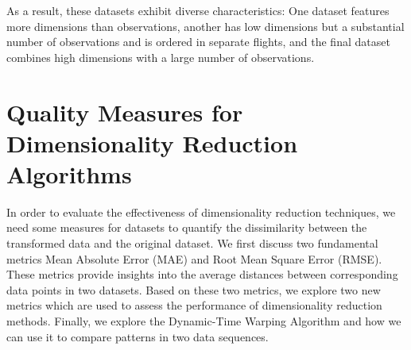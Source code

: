 \documentclass[pdftex,12pt,a4paper]{report}
\begin{document}
As a result, these datasets exhibit diverse characteristics:
One dataset features more dimensions than observations, another has low dimensions but a substantial number of observations and is ordered in separate flights, and the final dataset combines high dimensions with a large number of observations.

\section{Quality Measures for Dimensionality Reduction Algorithms} \label{quality-measures}
In order to evaluate the effectiveness of dimensionality reduction techniques, we need some measures for datasets to quantify the dissimilarity between the transformed data and the original dataset.
We first discuss two fundamental metrics Mean Absolute Error (MAE) and Root Mean Square Error (RMSE).
These metrics provide insights into the average distances between corresponding data points in two datasets.
Based on these two metrics, we explore two new metrics which are used to assess the performance of dimensionality reduction methods.
Finally, we explore the Dynamic-Time Warping Algorithm and how we can use it to compare patterns in two data sequences.
\end{document}

